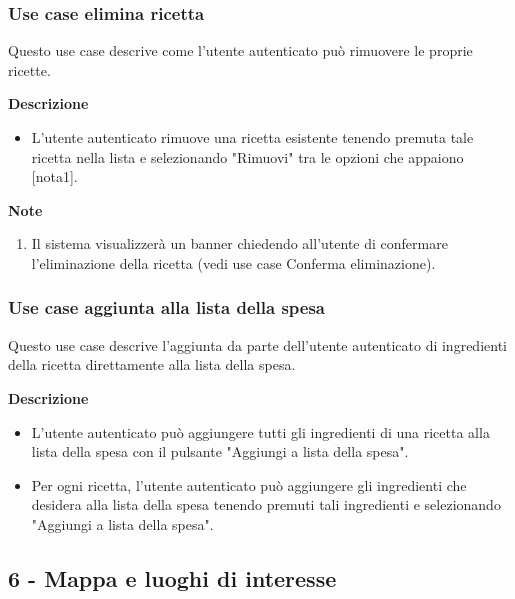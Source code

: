 \documentclass[a4paper,12pt]{article}
\begin{document}
\subsubsection*{Use case elimina ricetta}

Questo use case descrive come l'utente autenticato può rimuovere le proprie ricette.

\textbf{Descrizione}
\begin{itemize} \setlength\itemsep{0.01em}
\item L'utente autenticato rimuove una ricetta esistente tenendo premuta tale ricetta nella lista e selezionando "Rimuovi" tra le opzioni che appaiono [nota1].
\end{itemize}

\textbf{Note}
\begin{enumerate} \setlength\itemsep{0.01em}
\item Il sistema visualizzerà un banner chiedendo all'utente di confermare l'eliminazione della ricetta  (vedi use case Conferma eliminazione).
\end{enumerate}




\subsubsection*{Use case aggiunta alla lista della spesa}

 Questo use case descrive l'aggiunta da parte dell'utente autenticato di ingredienti della ricetta direttamente alla lista della spesa.
 
\textbf{Descrizione}
\begin{itemize} \setlength\itemsep{0.01em}
\item L'utente autenticato può aggiungere tutti gli ingredienti di una ricetta alla lista della spesa con il pulsante "Aggiungi a lista della spesa".
\item Per ogni ricetta, l'utente autenticato può aggiungere gli ingredienti che desidera alla lista della spesa tenendo premuti tali ingredienti e selezionando "Aggiungi a lista della spesa".
\end{itemize}







\subsection*{6 - Mappa e luoghi di interesse }
\end{document}
